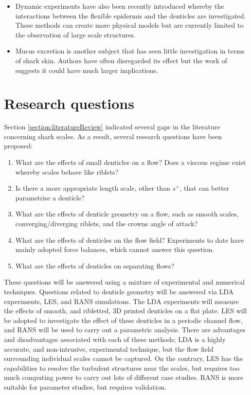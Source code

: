 \documentclass[12pt,oneside,a4paper]{article}
\begin{document}
\begin{itemize}
%
\item Dynamic experiments have also been recently introduced whereby the interactions between the flexible epidermis and the denticles are investigated. These methods can create more physical models but are currently limited to the observation of large scale structures. 
%
\item Mucus excretion is another subject that has seen little investigation in terms of shark skin. Authors have often disregarded its effect but the work of \cite{zhang2011b} suggests it could have much larger implications. 
%
\end{itemize}

\section{Research questions}

Section \ref{section:literatureReview} indicated several gaps in the literature concerning shark scales. As a result, several research questions have been proposed:
\begin{enumerate}
\item What are the effects of small denticles on a flow? Does a viscous regime exist whereby scales behave like riblets?
\item Is there a more appropriate length scale, other than $s^+$, that can better parametrise a denticle?
\item What are the effects of denticle geometry on a flow, such as smooth scales, converging/diverging riblets, and the crowns angle of attack?
\item What are the effects of denticles on the flow field? Experiments to date have mainly adopted force balances, which cannot answer this question.
\item What are the effects of denticles on separating flows?
\end{enumerate}

These questions will be answered using a mixture of experimental and numerical techniques. Questions related to denticle geometry will be answered via LDA experiments, LES, and RANS simulations. The LDA experiments will measure the effects of smooth, and ribletted, 3D printed denticles on a flat plate. LES will be adopted to investigate the effect of these denticles in a periodic channel flow, and RANS will be used to carry out a parametric analysis. There are advantages and disadvantages associated with each of these methods; LDA is a highly accurate, and non-intrusive, experimental technique, but the flow field surrounding individual scales cannot be captured. On the contrary, LES has the capabilities to resolve the turbulent structures near the scales, but requires too much computing power to carry out lots of different case studies. RANS is more suitable for parameter studies, but requires validation. 
\end{document}
